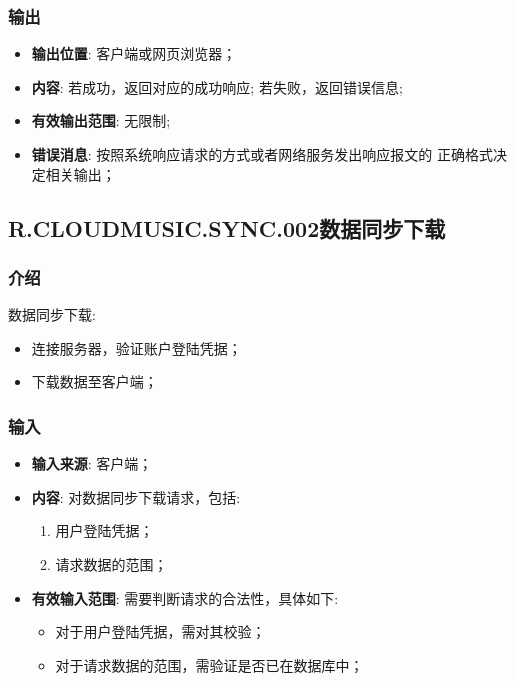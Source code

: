 \subsubsection{输出}
\begin{itemize}
	\item \textbf{输出位置}: 客户端或网页浏览器；
	\item \textbf{内容}: 若成功，返回对应的成功响应; 若失败，返回错误信息;
	\item \textbf{有效输出范围}: 无限制;
	\item \textbf{错误消息}: 按照系统响应请求的方式或者网络服务发出响应报文的
		正确格式决定相关输出；
\end{itemize}

\subsection{R.CLOUDMUSIC.SYNC.002数据同步下载}
\subsubsection{介绍}
	数据同步下载:
	\begin{itemize}
		\item 连接服务器，验证账户登陆凭据；
		\item 下载数据至客户端；
	\end{itemize}
\subsubsection{输入}
	\begin{itemize}
		\item \textbf{输入来源}: 客户端；
		\item \textbf{内容}: 对数据同步下载请求，包括: 
		\begin{enumerate}
			\item 用户登陆凭据；
			\item 请求数据的范围；
		\end{enumerate}
		\item \textbf{有效输入范围}: 需要判断请求的合法性，具体如下: 
		\begin{itemize}
			\item 对于用户登陆凭据，需对其校验； 
			\item 对于请求数据的范围，需验证是否已在数据库中； 
		\end{itemize}
	\end{itemize}
